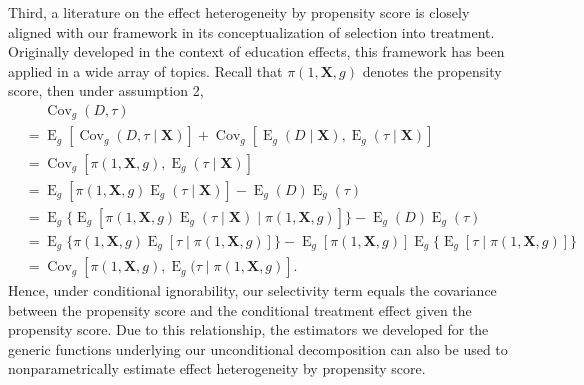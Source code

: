\documentclass[12pt,a4paper]{article}
\newcommand{\Cov}{\operatorname{Cov}}
\newcommand{\E}{\operatorname{E}}
\def\X{{\boldsymbol X}}
\begin{document}
Third, a literature on the effect heterogeneity by propensity score \citep{brand_who_2010, xie_estimating_2012, brand_uncovering_2021} is  closely aligned with our framework in its conceptualization of selection into treatment. Originally developed in the context of education effects, this framework has been applied in a wide array of topics.
Recall that $\pi(1,\X,g)$ denotes the propensity score, then under assumption 2,
\begin{align*}
&\phantom{{}={}} \Cov_g(D,\tau)  \\
&= \E_g[\Cov_g(D,\tau \mid \X)] + \Cov_g[\E_g(D \mid \X),\E_g(\tau \mid \X)] \\
&= \Cov_g[\pi(1,\X,g), \E_g(\tau \mid \X)] \\
&= \E_g [\pi(1,\X,g) \E_g(\tau \mid \X)] - \E_g(D)\E_g(\tau) \\
&= \E_g \lbrace \E_g [\pi(1,\X,g) \E_g(\tau \mid \X) \mid \pi(1,\X,g)] \rbrace - \E_g(D)\E_g(\tau) \\
&= \E_g \lbrace \pi(1,\X,g) \E_g[\tau \mid \pi(1,\X,g)] \rbrace - \E_g[\pi(1,\X,g)]\E_g\lbrace\E_g[\tau \mid \pi(1,\X,g)] \rbrace \\
&= \Cov_g [\pi(1,\X,g), \E_g(\tau \mid \pi(1,\X,g)].
\end{align*}
Hence, under conditional ignorability, our selectivity term equals the covariance between the propensity score and the conditional treatment effect given the propensity score. Due to this relationship, the estimators we developed for the generic functions underlying our unconditional decomposition can also be used to nonparametrically estimate effect heterogeneity by propensity score. 
\end{document}
